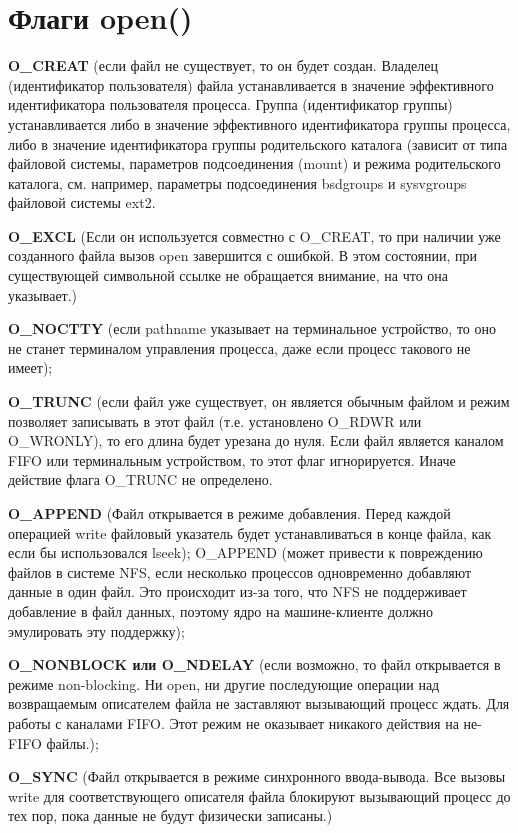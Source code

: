 \documentclass[12pt]{report}
\begin{document}
\section{Флаги open()}

\textbf{O\_CREAT}
(если файл не существует, то он будет создан. Владелец (идентификатор пользователя) файла устанавливается в значение эффективного идентификатора пользователя процесса. Группа (идентификатор группы) устанавливается либо в значение эффективного идентификатора группы процесса, либо в значение идентификатора группы родительского каталога (зависит от типа файловой системы, параметров подсоединения (mount) и режима родительского каталога, см. например, параметры подсоединения bsdgroups и sysvgroups файловой системы ext2.


\textbf{O\_EXCL}
(Если он используется совместно с O\_CREAT, то при наличии уже созданного файла вызов open завершится с ошибкой. В этом состоянии, при существующей символьной ссылке не обращается внимание, на что она указывает.)


\textbf{O\_NOCTTY}
(если pathname указывает на терминальное устройство, то оно не станет терминалом управления процесса, даже если процесс такового не имеет);


\textbf{O\_TRUNC}
(если файл уже существует, он является обычным файлом и режим позволяет записывать в этот файл (т.е. установлено O\_RDWR или O\_WRONLY), то его длина будет урезана до нуля. Если файл является каналом FIFO или терминальным устройством, то этот флаг игнорируется. Иначе действие флага O\_TRUNC не определено.


\textbf{O\_APPEND}
(Файл открывается в режиме добавления. Перед каждой операцией write файловый указатель будет устанавливаться в конце файла, как если бы использовался lseek); O\_APPEND (может привести к повреждению файлов в системе NFS, если несколько процессов одновременно добавляют данные в один файл. Это происходит из-за того, что NFS не поддерживает добавление в файл данных, поэтому ядро на машине-клиенте должно эмулировать эту поддержку);


\textbf{O\_NONBLOCK или O\_NDELAY}
(если возможно, то файл открывается в режиме non-blocking. Ни open, ни другие последующие операции над возвращаемым описателем файла не заставляют вызывающий процесс ждать. Для работы с каналами FIFO. Этот режим не оказывает никакого действия на не-FIFO файлы.);


\textbf{O\_SYNC}
(Файл открывается в режиме синхронного ввода-вывода. Все вызовы write для соответствующего описателя файла блокируют вызывающий процесс до тех пор, пока данные не будут физически записаны.)
\end{document}
